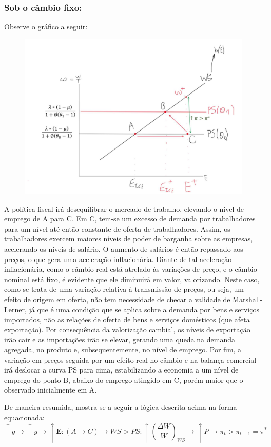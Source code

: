 \documentclass[a4paper,12pt]{article}[abntex2]
\begin{document}
\subsubsection{\textbf{Sob o câmbio fixo:}}
Observe o gráfico a seguir: 
\begin{figure}[H]
    \centering
    \includegraphics[width=0.7\linewidth]{Imagens/a25i1.png}
\end{figure}

A política fiscal irá desequilibrar o mercado de trabalho, elevando o nível de emprego de A para C. Em C, tem-se um excesso de demanda por trabalhadores para um nível até então constante de oferta de trabalhadores. Assim, os trabalhadores exercem maiores níveis de poder de barganha sobre as empresas, acelerando os níveis de salário. O aumento de salários é então repassado aos preços, o que gera uma aceleração inflacionária. Diante de tal aceleração inflacionária, como o câmbio real está atrelado às variações de preço, e o câmbio nominal está fixo, é evidente que ele diminuirá em valor, valorizando. Neste caso, como se trata de uma variação relativa à transmissão de preços, ou seja, um efeito de origem em oferta, não tem necessidade de checar a validade de Marshall-Lerner, já que é uma condição que se aplica sobre a demanda por bens e serviços importados, não as relações de oferta de bens e serviços domésticos (que afeta exportação). Por consequência da valorização cambial, os níveis de exportação irão cair  e  as  importações  irão  se  elevar,  gerando  uma  queda  na  demanda  agregada,  no  produto  e, subsequentemente, no nível de emprego. Por fim, a variação em preços seguida por um efeito real no câmbio e na balança comercial irá deslocar a curva PS para cima, estabilizando a economia a um nível de emprego do ponto B, abaixo do emprego atingido em C, porém maior que o observado inicialmente em A. 

De maneira resumida, mostra-se a seguir a lógica descrita acima na forma equacionada: 
\[
\uparrow g \rightarrow \uparrow y \rightarrow \uparrow \mathbf{E}\!:\!(A \rightarrow C) \rightarrow WS > PS : 
\uparrow \left( \frac{\Delta W}{W} \right)_{WS} \rightarrow \uparrow P \rightarrow \pi_t > \pi_{t-1} = \pi^*
\]
\end{document}
